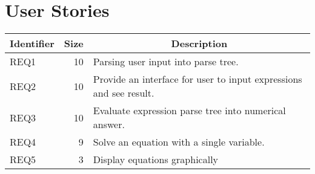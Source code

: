 \documentclass[letterpaper]{article}
\begin{document}
\section{User Stories}
\begin{tabular}{|l|r|l|}
\hline
\multicolumn{1}{|c|}{\textbf{Identifier}} & \multicolumn{1}{c|}{\textbf{Size}} & \multicolumn{1}{c|}{\textbf{Description}} \\ \hline
REQ1 & 10 & Parsing user input into parse tree. \\ \hline
REQ2 & 10 & Provide an interface for user to input expressions and see result.\\ \hline
REQ3 & 10 & Evaluate expression parse tree into numerical answer. \\ \hline
REQ4 & 9  & Solve an equation with a single variable. \\ \hline
REQ5 & 3  & Display equations graphically \\ \hline
\end{tabular}
\end{document}
